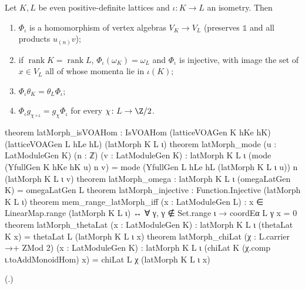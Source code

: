 \begin{theorem}[Functoriality]\label{ch03:thm:latMorph}
Let $K,L$ be even positive-definite lattices and $\iota\colon K\to L$ an isometry. Then
\begin{enumerate}[label=(\roman*)]
\item $\Phi_\iota$ is a homomorphism of vertex algebras $V_K\to V_L$ (preserves $\mathbb 1$ and all
  products $u_{(n)}v$);
\item if $\operatorname{rank}K=\operatorname{rank}L$, $\Phi_\iota(\omega_K)=\omega_L$ and $\Phi_\iota$
  is injective, with image the set of $x\in V_L$ all of whose momenta lie in $\iota(K)$;
\item $\Phi_\iota\theta_K=\theta_L\Phi_\iota$;
\item $\Phi_\iota g_{\chi\circ\iota}=g_\chi\Phi_\iota$ for every $\chi\colon L\to\Z/2$.
\end{enumerate}
\end{theorem}
\begin{leancode}
theorem latMorph_isVOAHom :
    IsVOAHom (latticeVOAGen K hKe hK) (latticeVOAGen L hLe hL) (latMorph K L ι)
theorem latMorph_mode (u : LatModuleGen K) (n : ℤ) (v : LatModuleGen K) :
    latMorph K L ι (mode (YfullGen K hKe hK u) n v)
      = mode (YfullGen L hLe hL (latMorph K L ι u)) n (latMorph K L ι v)
theorem latMorph_omega : latMorph K L ι (omegaLatGen K) = omegaLatGen L
theorem latMorph_injective : Function.Injective (latMorph K L ι)
theorem mem_range_latMorph_iff (x : LatModuleGen L) :
    x ∈ LinearMap.range (latMorph K L ι) ↔ ∀ γ, γ ∉ Set.range ι → coordEα L γ x = 0
theorem latMorph_thetaLat (x : LatModuleGen K) :
    latMorph K L ι (thetaLat K x) = thetaLat L (latMorph K L ι x)
theorem latMorph_chiLat (χ : L.carrier →+ ZMod 2) (x : LatModuleGen K) :
    latMorph K L ι (chiLat K (χ.comp ι.toAddMonoidHom) x) = chiLat L χ (latMorph K L ι x)
\end{leancode}
(.)

